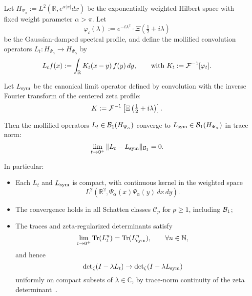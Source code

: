 \begin{lemma}
\label{lem:kernel_trace_norm_convergence}
Let \( H_{\Psi_\alpha} := L^2(\mathbb{R}, e^{\alpha |x|} dx) \) be the exponentially weighted Hilbert space with fixed weight parameter \( \alpha > \pi \). Let
\[
\varphi_t(\lambda) := e^{-t\lambda^2} \cdot \Xi\left( \tfrac{1}{2} + i\lambda \right)
\]
be the Gaussian-damped spectral profile, and define the mollified convolution operators \( L_t \colon H_{\Psi_\alpha} \to H_{\Psi_\alpha} \) by
\[
L_t f(x) := \int_{\mathbb{R}} K_t(x - y)\, f(y)\, dy, \qquad \text{with } K_t := \mathcal{F}^{-1}[\varphi_t].
\]

Let \( L_{\mathrm{sym}} \) be the canonical limit operator defined by convolution with the inverse Fourier transform of the centered zeta profile:
\[
K := \mathcal{F}^{-1}\left[ \Xi\left(\tfrac{1}{2} + i\lambda \right) \right].
\]

\medskip
\noindent
Then the mollified operators \( L_t \in \mathcal{B}_1(H_{\Psi_\alpha}) \) converge to \( L_{\mathrm{sym}} \in \mathcal{B}_1(H_{\Psi_\alpha}) \) in trace norm:
\[
\lim_{t \to 0^+} \| L_t - L_{\mathrm{sym}} \|_{\mathcal{B}_1} = 0.
\]

\medskip
\noindent
In particular:
\begin{itemize}
  \item Each \( L_t \) and \( L_{\mathrm{sym}} \) is compact, with continuous kernel in the weighted space
  \[
  L^2\left( \mathbb{R}^2, \Psi_\alpha(x) \Psi_\alpha(y) \, dx \, dy \right).
  \]
  \item The convergence holds in all Schatten classes \( \mathcal{C}_p \) for \( p \ge 1 \), including \( \mathcal{B}_1 \);
  \item The traces and zeta-regularized determinants satisfy
  \[
  \lim_{t \to 0^+} \operatorname{Tr}(L_t^n) = \operatorname{Tr}(L_{\mathrm{sym}}^n), \qquad \forall n \in \mathbb{N},
  \]
  and hence
  \[
  \det\nolimits_{\zeta}(I - \lambda L_t) \to \det\nolimits_{\zeta}(I - \lambda L_{\mathrm{sym}})
  \]
  uniformly on compact subsets of \( \lambda \in \mathbb{C} \), by trace-norm continuity of the zeta determinant~\cite[Ch.~4]{Simon2005TraceIdeals}.
\end{itemize}
\end{lemma}
